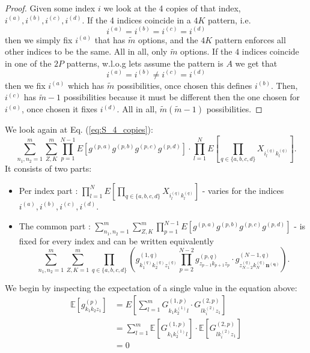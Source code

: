\documentclass[12pt,a4paper]{article}
\begin{document}
\begin{proof}
Given some index $i$  we look at the 4 copies of that index, $i^{(a)},i^{(b)},i^{(c)},i^{(d)}$.
If the 4 indices coincide in a $4K$  pattern, i.e. $$i^{(a)}=i^{(b)}=i^{(c)}=i^{(d)}$$ then we simply fix $i^{(a)}$  that has $\tilde{m}$ options, and the $4K$  pattern enforces all other indices to be the same. All in all, only $\tilde{m}$  options.
If the $4$  indices coincide in one of the $2P$  patterns, w.l.o.g lets assume the pattern is $A$ we get that $$i^{(a)}=i^{(b)}\not=i^{(c)}=i^{(d)}$$
then we fix $i^{(a)}$  which has $\tilde{m}$ possibilities, once chosen this defines $i^{(b)}$. Then, $i^{(c)}$  has $\tilde{m}-1$  possibilities because it must be different then the one chosen for $i^{(a)}$, once chosen it fixes $i^{(d)}$. All in all, $\tilde{m}(\tilde{m}-1)$  possibilities.

\end{proof}

We look again at Eq. (\ref{eq:S_4_copies}):
\[
\sum_{n_{1},n_{2}=1}^{m}\sum_{Z,K}^{m}\prod_{p=1}^{N-1}E\left[g^{(p,a)}g^{(p,b)}g^{(p,c)}g^{(p,d)}\right]\cdot\prod_{l=1}^{N}E\left[\prod_{q\in\{a,b,c,d\}}X_{i_{l}^{(q)}k_{l}^{(q)}}\right].
\]
It consists of two parts:
\begin{itemize}
\item Per index part : $\prod_{l=1}^{N}E\left[\prod_{q\in\{a,b,c,d\}}X_{i_{l}^{(q)}k_{l}^{(q)}}\right]$ - varies for the indices $i^{(a)},i^{(b)},i^{(c)},i^{(d)}$.
\item The common part : $\sum_{n_{1},n_{2}=1}^{m}\sum_{Z,K}^{m}\prod_{p=1}^{N-1}E\left[g^{(p,a)}g^{(p,b)}g^{(p,c)}g^{(p,d)}\right]$ - is fixed for every index and can be written equivalently \begin{equation}
    \sum_{n_{1},n_{2}=1}^{m}\sum_{Z,K=1}^{m}\prod_{q\in\{a,b,c,d\}}\left(g_{k_{1}^{(q)}k_{2}^{(q)}z_{1}^{(q)}}^{(1,q)}\prod_{p=2}^{N-2}g_{z_{p-1}k_{p+1}z_{p}}^{(p,q)}\cdot g_{z_{N-2}^{(q)}k_{N}^{(q)}\boldsymbol{n^{(q)}}}^{(N-1,q)}\right)\label{eq:common}.
\end{equation}
\end{itemize}
We begin by inspecting the expectation of a single value in the equation above:
\begin{align}
\mathbb{E}[g^{(p)}_{k_1k_2z_1}] & =E\left[\sum_{l=1}^{m}G^{(1,p)}_{k_{1}k_{2}^{(1)}l}\cdot G^{(2,p)}_{lk_{i}^{(2)}z_{1}}\right]\\
 & =\sum_{l=1}^{m}\mathbb{E}[G^{(1,p)}_{k_{1}k_{2}^{(1)}l}]\cdot \mathbb{E}[G^{(2,p)}_{lk_{i}^{(2)}z_{1}}]\\
 & =0
\end{align}
\end{document}
